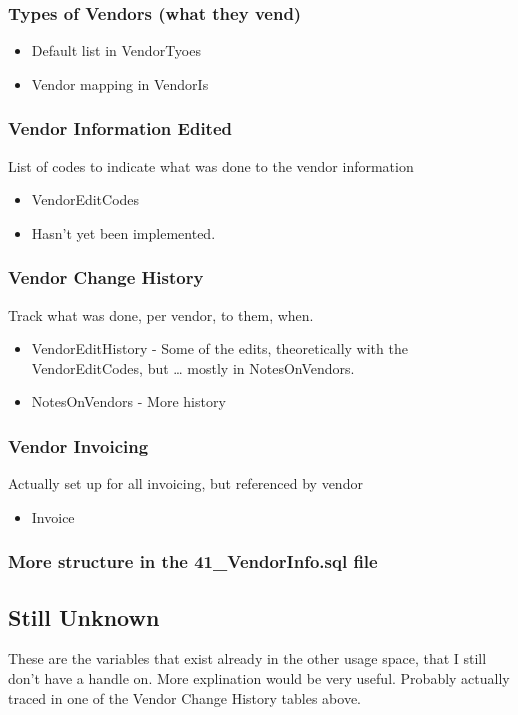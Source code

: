 \documentclass[captions=tablesignature]{scrartcl}
\begin{document}
\subsubsection{Types of Vendors (what they vend)}
\label{sec-2-5-10}
\begin{itemize}
\item Default list in VendorTyoes
\item Vendor mapping in VendorIs
\end{itemize}

\subsubsection{Vendor Information Edited}
\label{sec-2-5-11}
List of codes to indicate what was done to the vendor information
\begin{itemize}
\item VendorEditCodes
\item Hasn't yet been implemented.
\end{itemize}

\subsubsection{Vendor Change History}
\label{sec-2-5-12}
Track what was done, per vendor, to them, when.
\begin{itemize}
\item VendorEditHistory - Some of the edits, theoretically with the
VendorEditCodes, but \ldots{} mostly in NotesOnVendors.
\item NotesOnVendors - More history
\end{itemize}

\subsubsection{Vendor Invoicing}
\label{sec-2-5-13}
Actually set up for all invoicing, but referenced by vendor
\begin{itemize}
\item Invoice
\end{itemize}

\subsubsection{More structure in the 41\_VendorInfo.sql file}
\label{sec-2-5-14}

\subsection{Still Unknown}
\label{sec-2-6}
These are the variables that exist already in the other usage
space, that I still don't have a handle on.  More explination would
be very useful.  Probably actually traced in one of the Vendor
Change History tables above.
\end{document}
